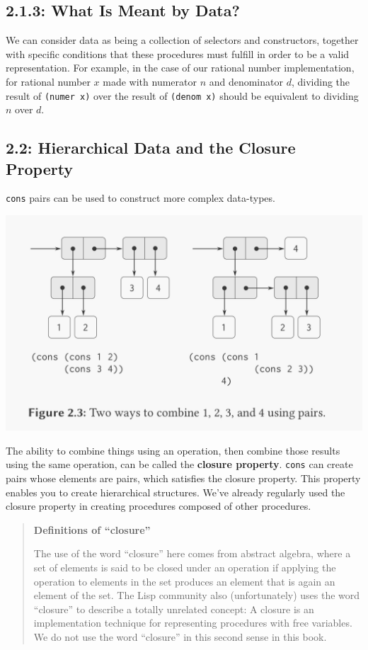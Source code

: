 \documentclass[final,fleqn,titlepage]{article}
\begin{document}
\subsection{2.1.3: What Is Meant by Data?}
\label{sec:org6b3b444}
We can consider data as being a collection of selectors and constructors,
together with specific conditions that these procedures must fulfill in order to
be a valid representation. For example, in the case of our rational number
implementation, for rational number \(x\) made with numerator \(n\) and
denominator \(d\), dividing the result of \texttt{(numer x)} over the result
of \texttt{(denom x)} should be equivalent to dividing \(n\) over \(d\).

\subsection{2.2: Hierarchical Data and the Closure Property}
\label{sec:orgd69531f}
\texttt{cons} pairs can be used to construct more complex data-types.

\begin{center}
\includegraphics[width=.9\linewidth]{2/cons-cells.jpeg}
\end{center}

The ability to combine things using an operation, then combine those results
using the same operation, can be called the \textbf{closure property}. \texttt{cons} can
create pairs whose elements are pairs, which satisfies the closure property.
This property enables you to create hierarchical structures. We've already
regularly used the closure property in creating procedures composed of other
procedures.

\begin{quote}
\textbf{Definitions of ``closure''}

The use of the word ``closure'' here comes from abstract algebra, where a set of
elements is said to be closed under an operation if applying the operation to
elements in the set produces an element that is again an element of the set.
The Lisp community also (unfortunately) uses the word ``closure'' to describe a
totally unrelated concept: A closure is an implementation technique for
representing procedures with free variables. We do not use the word ``closure''
in this second sense in this book.
\end{quote}
\end{document}
